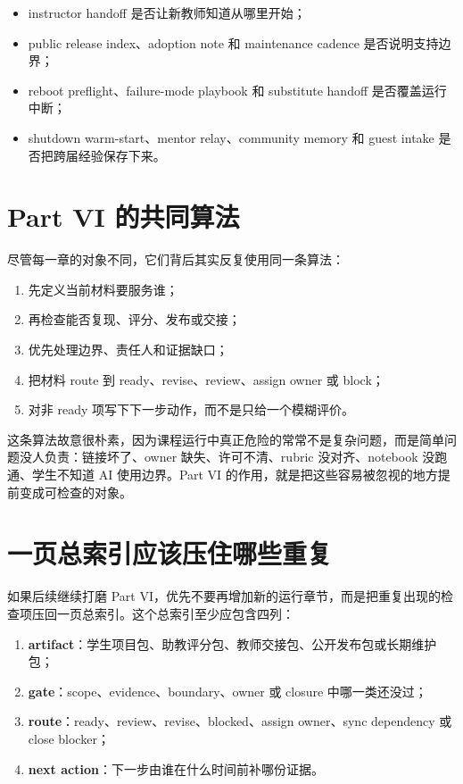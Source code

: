 \begin{itemize}
    \item instructor handoff 是否让新教师知道从哪里开始；
    \item public release index、adoption note 和 maintenance cadence 是否说明支持边界；
    \item reboot preflight、failure-mode playbook 和 substitute handoff 是否覆盖运行中断；
    \item shutdown warm-start、mentor relay、community memory 和 guest intake 是否把跨届经验保存下来。
\end{itemize}

\section*{Part VI 的共同算法}

尽管每一章的对象不同，它们背后其实反复使用同一条算法：

\begin{enumerate}
    \item 先定义当前材料要服务谁；
    \item 再检查能否复现、评分、发布或交接；
    \item 优先处理边界、责任人和证据缺口；
    \item 把材料 route 到 ready、revise、review、assign owner 或 block；
    \item 对非 ready 项写下下一步动作，而不是只给一个模糊评价。
\end{enumerate}

这条算法故意很朴素，因为课程运行中真正危险的常常不是复杂问题，而是简单问题没人负责：链接坏了、owner 缺失、许可不清、rubric 没对齐、notebook 没跑通、学生不知道 AI 使用边界。Part VI 的作用，就是把这些容易被忽视的地方提前变成可检查的对象。

\section*{一页总索引应该压住哪些重复}

如果后续继续打磨 Part VI，优先不要再增加新的运行章节，而是把重复出现的检查项压回一页总索引。这个总索引至少应包含四列：

\begin{enumerate}
    \item \textbf{artifact}：学生项目包、助教评分包、教师交接包、公开发布包或长期维护包；
    \item \textbf{gate}：scope、evidence、boundary、owner 或 closure 中哪一类还没过；
    \item \textbf{route}：ready、review、revise、blocked、assign owner、sync dependency 或 close blocker；
    \item \textbf{next action}：下一步由谁在什么时间前补哪份证据。
\end{enumerate}

